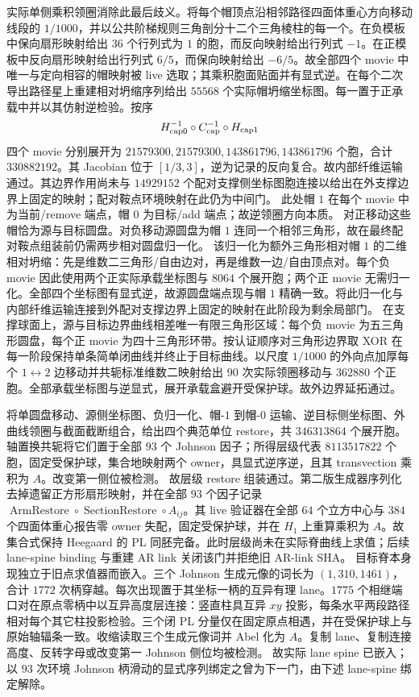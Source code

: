 \documentclass[11pt]{amsart}
\theoremstyle{definition}
\theoremstyle{remark}
\begin{document}
实际单侧乘积领圈消除此最后歧义。将每个帽顶点沿相邻路径四面体重心方向移动线段的 $1/1000$，并以公共阶梯规则三角剖分十二个三角棱柱的每一个。在负模板中保向扇形映射给出 $36$ 个行列式为 $1$ 的胞，而反向映射给出行列式 $-1$。在正模板中反向扇形映射给出行列式 $6/5$，而保向映射给出 $-6/5$。故全部四个 movie 中唯一与定向相容的帽映射被 live 选取；其乘积胞面贴面并有显式逆。在每个二次导出路径星上重建相对坍缩序列给出 $55568$ 个实际帽坍缩坐标图。每一置于正承载中并以其仿射逆检验。按序
\begin{equation*}
H_{\rm cap0}^{-1}\circ C_{\rm cap}^{-1}\circ H_{\rm cap1}
\end{equation*}
四个 movie 分别展开为 $21579300,21579300,143861796,143861796$ 个胞，合计 $330882192$。其 Jacobian 位于 $[1/3,3]$，逆为记录的反向复合。故内部纤维运输通过。其边界作用尚未与 $14929152$ 个配对支撑侧坐标图胞连接以给出在外支撑边界上固定的映射；配对鞍点环境映射在此仍为中间门。
此处帽 $1$ 在每个 movie 中为当前/remove 端点，帽 $0$ 为目标/add 端点；故逆领圈方向本质。
对正移动这些帽恰为源与目标圆盘。对负移动源圆盘为帽 $1$ 连同一个相邻三角形，故在最终配对鞍点组装前仍需两步相对圆盘归一化。
该归一化为额外三角形相对帽 $1$ 的二维相对坍缩：先是维数二三角形/自由边对，再是维数一边/自由顶点对。每个负 movie 因此使用两个正实际承载坐标图与 $8064$ 个展开胞；两个正 movie 无需归一化。全部四个坐标图有显式逆，故源圆盘端点现与帽 $1$ 精确一致。将此归一化与内部纤维运输连接到外配对支撑边界上固定的映射在此阶段为剩余局部门。
在支撑球面上，源与目标边界曲线相差唯一有限三角形区域：每个负 movie 为五三角形圆盘，每个正 movie 为四十三角形环带。按认证顺序对三角形边界取 XOR 在每一阶段保持单条简单闭曲线并终止于目标曲线。以尺度 $1/1000$ 的外向点加厚每个 $1\leftrightarrow2$ 边移动并共轭标准维数二映射给出 $90$ 次实际领圈移动与 $362880$ 个正胞。全部承载坐标图与逆显式，展开承载盒避开受保护球。故外边界延拓通过。

将单圆盘移动、源侧坐标图、负归一化、帽-$1$ 到帽-$0$ 运输、逆目标侧坐标图、外曲线领圈与截面截断组合，给出四个典范单位 restore，共 $346313864$ 个展开胞。轴置换共轭将它们置于全部 $93$ 个 Johnson 因子；所得层级代表 $8113517822$ 个胞，固定受保护球，集合地映射两个 owner，具显式逆序逆，且其 transvection 乘积为 $A$。改变第一侧位被检测。
故层级 restore 组装通过。第二版生成器序列化去掉遗留正方形扇形映射，并在全部 $93$ 个因子记录
$\operatorname{ArmRestore}\circ\operatorname{SectionRestore}\circ A_{ij}$。其 live 验证器在全部 $64$ 个立方中心与 $384$ 个四面体重心报告零 owner 失配，固定受保护球，并在 $H_1$ 上重算乘积为 $A$。故集合式保持 Heegaard 的 PL 同胚完备。此时层级尚未在实际脊曲线上求值；后续 lane-spine binding 与重建 AR link 关闭该门并拒绝旧 AR-link SHA。
目标脊本身现独立于旧点求值器而嵌入。三个 Johnson 生成元像的词长为
$(1,310,1461)$，合计 $1772$ 次柄穿越。每次出现置于其坐标一柄的互异有理 lane。$1775$ 个相继端口对在原点零柄中以互异高度层连接：竖直柱具互异 $xy$ 投影，每条水平两段路径相对每个其它柱投影检验。三个闭 PL 分量仅在固定原点相遇，并在受保护球上与原始轴辐条一致。收缩读取三个生成元像词并 Abel 化为 $A$。复制 lane、复制连接高度、反转字母或改变第一 Johnson 侧位均被检测。
故实际 lane spine 已嵌入；以 $93$ 次环境 Johnson 柄滑动的显式序列绑定之曾为下一门，由下述 lane-spine 绑定解除。
\end{document}
